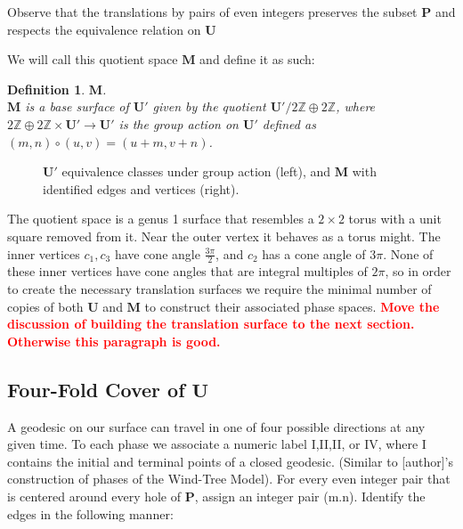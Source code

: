 \documentclass[]{article}
\newtheorem{Def}{Definition}[subsection]
\newcommand{\compat}[1]{\textbf{\textcolor{red}{#1}}}
\begin{document}
Observe that the translations by pairs of even integers preserves the subset $\mathbf P$ and respects the equivalence relation on $\mathbf U$

We will call this quotient space $\mathbf{M}$ and define it as such:
\begin{Def}{$\mathbf{M}$.}\\
$\mathbf{M}$ is a base surface of $\mathbf{U}'$ given by the quotient $\mathbf{U}'/2\mathbb{Z}\oplus2\mathbb{Z}$, where $2\mathbb{Z}\oplus2\mathbb{Z}\times\mathbf{U}'\rightarrow\mathbf{U}'$ is the group action on $\mathbf{U}'$ defined as $(m,n)\circ(u,v)=(u+m,v+n)$.
\end{Def}

\begin{figure}[H]
\begin{center}
\hspace{0.2in}

\end{center}
\caption{$\mathbf{U}'$ equivalence classes under group action (left), and $\mathbf{M}$ with identified edges and vertices (right).}
\label{fig:quotient}
\end{figure}

The quotient space is a genus 1 surface that resembles a $2\times2$ torus with a unit square removed from it. Near the outer vertex it behaves as a torus might. The inner vertices $c_{1},c_{3}$ have cone angle $\frac{3\pi}{2}$, and $c_{2}$ has a cone angle of $3\pi$. None of these inner vertices have cone angles that are integral multiples of $2\pi$, so in order to create the necessary translation surfaces we require the minimal number of copies of both $\mathbf{U}$ and $\mathbf{M}$ to construct their associated phase spaces.  \compat{Move the discussion of building the translation surface to the next section. Otherwise this paragraph is good.}

\subsection{Four-Fold Cover of $\mathbf{U}$}
A geodesic on our surface can travel in one of four possible directions at any given time. To each phase we associate a numeric label I,II,II, or IV, where I contains the initial and terminal points of a closed geodesic. (Similar to [author]'s construction of phases of the Wind-Tree Model). For every even integer pair that is centered around every hole of $\mathbf{P}$, assign an integer pair (m.n). Identify the edges in the following manner:
\end{document}
